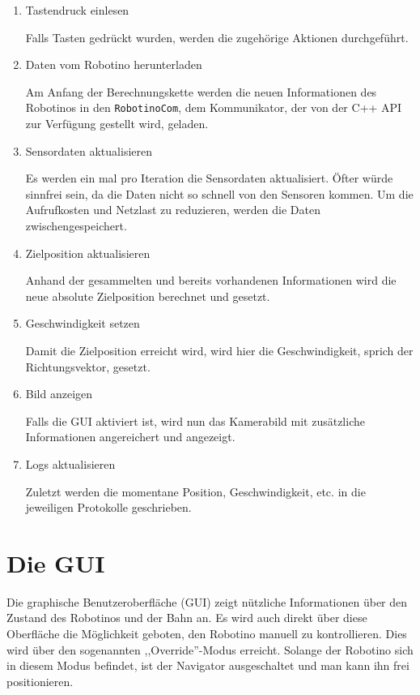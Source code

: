 \begin{enumerate}
	\item Tastendruck einlesen
	
		Falls Tasten gedrückt wurden, werden die zugehörige Aktionen
		durchgeführt.

	\item Daten vom Robotino herunterladen

		Am Anfang der Berechnungskette werden die neuen Informationen des
		Robotinos in den \verb|RobotinoCom|, dem Kommunikator, der von der C++
		API zur Verfügung gestellt wird, geladen.

	\item Sensordaten aktualisieren

		Es werden ein mal pro Iteration die Sensordaten aktualisiert. Öfter würde
		sinnfrei sein, da die Daten nicht so schnell von den Sensoren kommen. Um
		die Aufrufkosten und Netzlast zu reduzieren, werden die Daten
		zwischengespeichert.

	\item Zielposition aktualisieren

		Anhand der gesammelten und bereits vorhandenen Informationen wird die
		neue absolute Zielposition berechnet und gesetzt.

	\item Geschwindigkeit setzen

		Damit die Zielposition erreicht wird, wird hier die Geschwindigkeit,
		sprich der Richtungsvektor, gesetzt.

	\item Bild anzeigen

		Falls die GUI aktiviert ist, wird nun das Kamerabild mit zusätzliche
		Informationen angereichert und angezeigt.

	\item Logs aktualisieren

		Zuletzt werden die momentane Position, Geschwindigkeit, etc. in die
		jeweiligen Protokolle geschrieben.
\end{enumerate}


\section{Die GUI}

Die graphische Benutzeroberfläche (GUI) zeigt nützliche Informationen über den
Zustand des Robotinos und der Bahn an. Es wird auch direkt über diese
Oberfläche die Möglichkeit geboten, den Robotino manuell zu kontrollieren. Dies
wird über den sogenannten ,,Override''-Modus erreicht. Solange der Robotino
sich in diesem Modus befindet, ist der Navigator ausgeschaltet und man kann ihn
frei positionieren.

